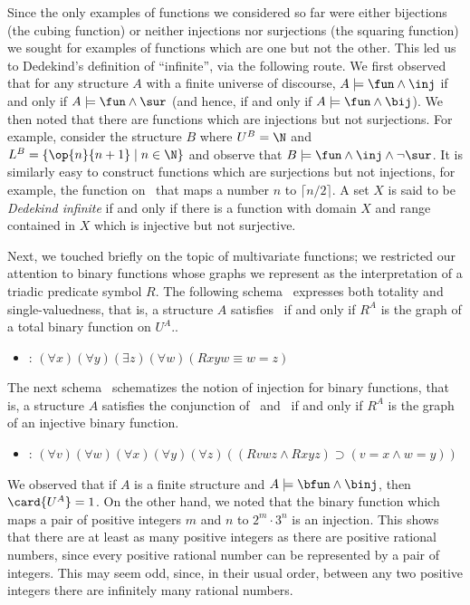 Since the only examples of functions we considered so far were either bijections (the cubing function) or neither injections nor surjections (the squaring function) we sought for examples of functions which are one but not the other. This led us to Dedekind's definition of ``infinite'', via the following route. We first observed that for any structure $A$ with a finite universe of discourse, $A\models \fun\wedge\inj$ if and only if $A\models\fun\wedge\sur$ (and hence, if and only if $A\models\fun\wedge\bij$). We then noted that there are functions which are injections but not surjections. For example, consider the structure $B$ where $U^B=\N$ and $L^B=\{\op{n}{n+1}\mid n\in\N\}$ and observe that $B\models\fun\wedge\inj\wedge\neg\sur$. It is similarly easy to construct functions which are surjections but not injections, for example, the function on \N\ that maps a number $n$ to $\lceil n/2\rceil$.  A set $X$ is said to be \emph{Dedekind infinite} if and only if there is a function with domain $X$ and range contained in $X$ which is injective but not surjective.

Next, we touched briefly on the topic of multivariate functions; we restricted our attention to binary functions whose graphs we represent as the interpretation of a triadic predicate symbol $R$. The following schema \bfun\ expresses both totality and single-valuedness, that is, a structure $A$ satisfies \bfun\ if and only if $R^A$ is the graph of a total binary function on $U^A$..
\begin{itemize}
\item
\bfun: $(\forall x)(\forall y)(\exists
z)(\forall 
w)(Rxyw\equiv w = z)$
\end{itemize}
The next schema \binj\ schematizes the notion of injection for binary functions, that is, a structure $A$ satisfies the conjunction of \bfun\ and \binj\ if and only if $R^A$ is the graph of an injective binary function.
\begin{itemize}
\item 
\binj: $(\forall v)(\forall w)(\forall x)(\forall y)(\forall z)((Rvwz \wedge Rxyz)
\supset (v = x \wedge w = y))$
\end{itemize}
We observed that if $A$ is a finite structure and $A\models\bfun\wedge\binj$, then $\card{U^A}=1$. On the other hand, we noted that the binary function which maps a pair of positive integers $m$ and $n$ to $2^m\cdot3^n$ is an injection. This shows that there are at least as many positive integers as there are positive rational numbers, since every positive rational number can be represented by a pair of integers. This may seem odd, since, in their usual order, between any two positive integers there are infinitely many rational numbers. 
